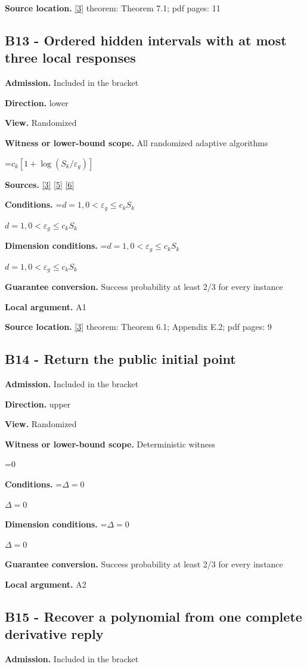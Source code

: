 \documentclass[10pt,a4paper]{article}
\newcommand{\AtlasMath}[1]{\par\begingroup\centering\setbox0=\hbox{$\displaystyle #1$}\ifdim\wd0>1.4\linewidth\typeout{ATLAS WIDE FORMULA: \the\wd0}\fi\ifdim\wd0>\linewidth\resizebox{\linewidth}{!}{\box0}\else\box0\fi\par\endgroup}
\newcommand{\AtlasInlineMath}[1]{\begingroup\setbox0=\hbox{$#1$}\ifdim\wd0>.4\linewidth\endgroup\AtlasMath{#1}\else\endgroup$#1$\fi}
\begin{document}
\textbf{Source location.} \href{https://arxiv.org/abs/2610.16295}{[3]} theorem: Theorem 7.1; pdf pages: 11

\subsection{B13 - Ordered hidden intervals with at most three local responses}
\textbf{Admission.} Included in the bracket

\textbf{Direction.} lower

\textbf{View.} Randomized

\textbf{Witness or lower-bound scope.} All randomized adaptive algorithms

\AtlasMath{c_k[1+\log(S_k/\varepsilon_g)]}
\textbf{Sources.} \href{https://arxiv.org/abs/2610.16295}{[3]} \href{https://arxiv.org/abs/1710.11606v3}{[5]} \href{https://arxiv.org/abs/1811.01220}{[6]}

\textbf{Conditions.} \AtlasInlineMath{d=1, 0<\varepsilon_g\le c_k S_k}

\textbf{Dimension conditions.} \AtlasInlineMath{d=1, 0<\varepsilon_g\le c_k S_k}

\textbf{Guarantee conversion.} Success probability at least 2/3 for every instance

\textbf{Local argument.} A1

\textbf{Source location.} \href{https://arxiv.org/abs/2610.16295}{[3]} theorem: Theorem 6.1; Appendix E.2; pdf pages: 9

\subsection{B14 - Return the public initial point}
\textbf{Admission.} Included in the bracket

\textbf{Direction.} upper

\textbf{View.} Randomized

\textbf{Witness or lower-bound scope.} Deterministic witness

\AtlasMath{0}
\textbf{Conditions.} \AtlasInlineMath{\Delta=0}

\textbf{Dimension conditions.} \AtlasInlineMath{\Delta=0}

\textbf{Guarantee conversion.} Success probability at least 2/3 for every instance

\textbf{Local argument.} A2

\subsection{B15 - Recover a polynomial from one complete derivative reply}
\textbf{Admission.} Included in the bracket
\end{document}
